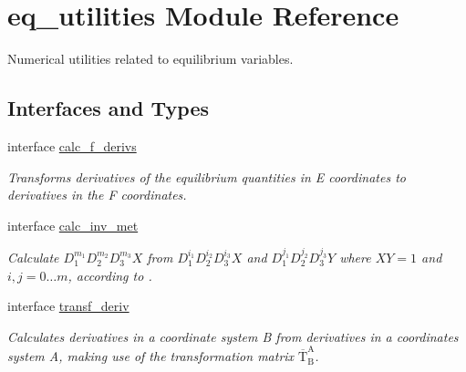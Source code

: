 \hypertarget{namespaceeq__utilities}{}\section{eq\+\_\+utilities Module Reference}
\label{namespaceeq__utilities}


Numerical utilities related to equilibrium variables.  


\subsection*{Interfaces and Types}
\begin{DoxyCompactItemize}
\item 
interface \hyperlink{interfaceeq__utilities_1_1calc__f__derivs}{calc\+\_\+f\+\_\+derivs}
\begin{DoxyCompactList}\small\item\em Transforms derivatives of the equilibrium quantities in E coordinates to derivatives in the F coordinates. \end{DoxyCompactList}\item 
interface \hyperlink{interfaceeq__utilities_1_1calc__inv__met}{calc\+\_\+inv\+\_\+met}
\begin{DoxyCompactList}\small\item\em Calculate $D_1^{m_1} D_2^{m_2} D_3^{m_3} X$ from $D_1^{i_1} D_2^{i_2} D_3^{i_3} X$ and $D_1^{j_1} D_2^{j_2} D_3^{j_3} Y$ where $XY=1$ and $i,j = 0\ldots m$, according to \cite{Weyens3D}. \end{DoxyCompactList}\item 
interface \hyperlink{interfaceeq__utilities_1_1transf__deriv}{transf\+\_\+deriv}
\begin{DoxyCompactList}\small\item\em Calculates derivatives in a coordinate system B from derivatives in a coordinates system A, making use of the transformation matrix $\overline{\text{T}}_\text{B}^\text{A}$. \end{DoxyCompactList}\end{DoxyCompactItemize}
